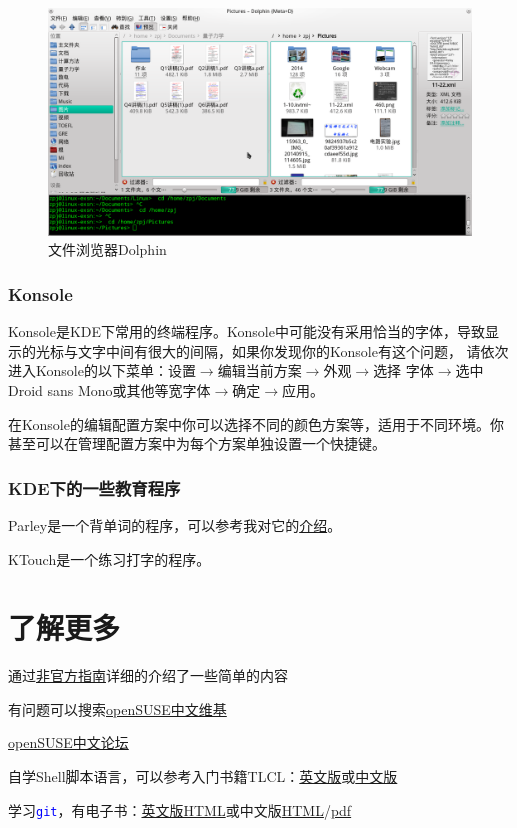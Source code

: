 \documentclass[12pt,openany]{book}
\newcommand{\soft}[1]{\texttt{\textcolor{blue}{#1}}}
\begin{document}
\begin{figure}[htb]
\centering
\includegraphics[width=\textwidth]{./pic/dolphin.png} 
\caption{文件浏览器Dolphin}
\end{figure}

\subsection{Konsole}
Konsole是KDE下常用的终端程序。Konsole中可能没有采用恰当的字体，导致显示的光标与文字中间有很大的间隔，如果你发现你的Konsole有这个问题，
请依次进入Konsole的以下菜单：设置$\rightarrow$编辑当前方案$\rightarrow$外观$\rightarrow$选择
字体$\rightarrow$选中Droid sans Mono或其他等宽字体$\rightarrow$确定$\rightarrow$应用。

在Konsole的编辑配置方案中你可以选择不同的颜色方案等，适用于不同环境。你甚至可以在管理配置方案中为每个方案单独设置一个快捷键。
\subsection{KDE下的一些教育程序}
Parley是一个背单词的程序，可以参考我对它的\href{http://home.ustc.edu.cn/~zpj/resource/%E8%AF%8D%E5%BA%93/}{介绍}。

KTouch是一个练习打字的程序。

\chapter{了解更多}
\begin{compactitem}
 \item 通过\href{https://lug.ustc.edu.cn/sites/opensuse-guide/}{非官方指南}详细的介绍了一些简单的内容
 \item 有问题可以搜索\href{https://zh.opensuse.org/%E9%A6%96%E9%A1%B5}{openSUSE中文维基}
 \item \href{https://forum.suse.org.cn/}{openSUSE中文论坛}
 \item 自学Shell脚本语言，可以参考入门书籍TLCL：\href{http://home.ustc.edu.cn/~zpj/doc/Linux/The_Linux_Command_Line.pdf}{英文版}或\href{http://home.ustc.edu.cn/~zpj/doc/Linux/The_Linux_Command_Line(%e4%b8%ad%e6%96%87%e7%89%88).pdf}{中文版}
 \item 学习\soft{git}，有电子书：\href{http://git-scm.com/book/}{英文版HTML}或中文版\href{http://git-scm.com/book/zh}{HTML}/\href{http://liam0205.me/attachment/Git/progit.zh.pdf}{pdf}
\end{compactitem}
\end{document}

